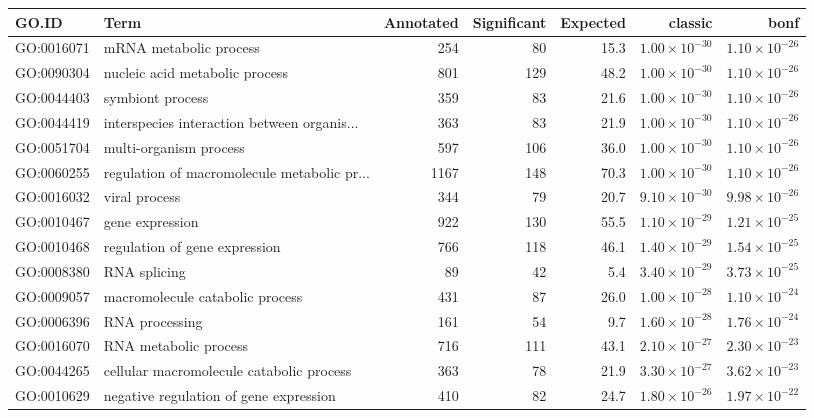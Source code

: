 \begin{table}[ht]
\centering
\begin{adjustbox}{width=\textwidth}
\begin{tabular}{llrrrrr}
  \hline
GO.ID & Term & Annotated & Significant & Expected & classic & bonf \\ 
  \hline
GO:0016071 & mRNA metabolic process & 254 & 80 & 15.3 & $1.00 \times 10^{-30}$ & $1.10 \times 10^{-26}$ \\ 
  GO:0090304 & nucleic acid metabolic process & 801 & 129 & 48.2 & $1.00 \times 10^{-30}$ & $1.10 \times 10^{-26}$ \\ 
  GO:0044403 & symbiont process & 359 & 83 & 21.6 & $1.00 \times 10^{-30}$ & $1.10 \times 10^{-26}$ \\ 
  GO:0044419 & interspecies interaction between organis... & 363 & 83 & 21.9 & $1.00 \times 10^{-30}$ & $1.10 \times 10^{-26}$ \\ 
  GO:0051704 & multi-organism process & 597 & 106 & 36.0 & $1.00 \times 10^{-30}$ & $1.10 \times 10^{-26}$ \\ 
  GO:0060255 & regulation of macromolecule metabolic pr... & 1167 & 148 & 70.3 & $1.00 \times 10^{-30}$ & $1.10 \times 10^{-26}$ \\ 
  GO:0016032 & viral process & 344 & 79 & 20.7 & $9.10 \times 10^{-30}$ & $9.98 \times 10^{-26}$ \\ 
  GO:0010467 & gene expression & 922 & 130 & 55.5 & $1.10 \times 10^{-29}$ & $1.21 \times 10^{-25}$ \\ 
  GO:0010468 & regulation of gene expression & 766 & 118 & 46.1 & $1.40 \times 10^{-29}$ & $1.54 \times 10^{-25}$ \\ 
  GO:0008380 & RNA splicing & 89 & 42 & 5.4 & $3.40 \times 10^{-29}$ & $3.73 \times 10^{-25}$ \\ 
  GO:0009057 & macromolecule catabolic process & 431 & 87 & 26.0 & $1.00 \times 10^{-28}$ & $1.10 \times 10^{-24}$ \\ 
  GO:0006396 & RNA processing & 161 & 54 & 9.7 & $1.60 \times 10^{-28}$ & $1.76 \times 10^{-24}$ \\ 
  GO:0016070 & RNA metabolic process & 716 & 111 & 43.1 & $2.10 \times 10^{-27}$ & $2.30 \times 10^{-23}$ \\ 
  GO:0044265 & cellular macromolecule catabolic process & 363 & 78 & 21.9 & $3.30 \times 10^{-27}$ & $3.62 \times 10^{-23}$ \\ 
  GO:0010629 & negative regulation of gene expression & 410 & 82 & 24.7 & $1.80 \times 10^{-26}$ & $1.97 \times 10^{-22}$ \\ 

\end{tabular}
\end{adjustbox}
\end{table}
